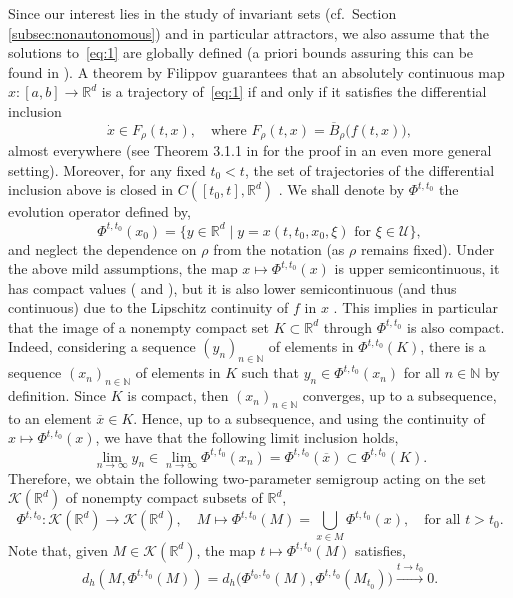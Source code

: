 \documentclass[reqno]{amsart}
\theoremstyle{definition}
\numberwithin{equation}{section}
\newcommand{\N}{\mathbb{N}}
\newcommand{\R}{\mathbb{R}}
\newcommand{\K}{\mathcal{K}}
\newcommand{\U}{\mathcal{U}}
\newcommand{\nin}{{n\in\N}}
\newcommand{\nti}{{n\to\infty}}
\begin{document}
Since our interest lies in the study of invariant sets (cf.~Section \ref{subsec:nonautonomous}) and in particular attractors, we also assume that the solutions to~\eqref{eq:1} are globally defined (a priori bounds assuring this can be found in \cite{hale2009ordinary, bressan2007introduction}). 
A theorem by Filippov guarantees that an absolutely continuous map $x: [a,b]\to \R^d$ is a trajectory of~\eqref{eq:1} if and only if it satisfies the differential inclusion
\begin{equation}
    \label{eq:set-valued-systems}
\dot x\in F_\rho(t,x),\quad\text{where } F_\rho(t,x)=\overline B_\rho\big(f(t,x)\big),
\end{equation}
almost everywhere (see Theorem 3.1.1 in \cite{bressan2007introduction} for the proof in an even more general setting). Moreover, for any fixed $t_0<t$, the set of trajectories of the differential inclusion above is closed in $C([t_0,t],\R^d)$ \cite[Theorem 3.3.1]{bressan2007introduction}. 
We shall denote by $\Phi^{t,t_0}$ the evolution operator defined by,
\[
\Phi^{t,t_0}(x_0)=\{y\in\R^d\mid y=x(t,t_0,x_0,\xi) \text{ for } \xi\in\U\},
\] 
and neglect the dependence on $\rho$ from the notation (as $\rho$ remains fixed).
 Under the above mild assumptions, the map $x\mapsto \Phi^{t,t_0}(x)$ is upper semicontinuous, %
 it has compact values (\cite[Corollary 7.1]{deimling2011multivalued} and \cite{aubin1984differential}), but it is also lower semicontinuous (and thus continuous) due to the Lipschitz continuity of $f$ in $x$ \cite[Corollary 2.4.1]{aubin1984differential}. 
 This implies in particular that the image of a nonempty compact set $K\subset \R^d$ through $\Phi^{t,t_0}$ is also compact. Indeed, considering a sequence $(y_n)_\nin$ of elements in $\Phi^{t,t_0}(K)$, there is a sequence $(x_n)_\nin$ of elements in $K$ such that $y_n\in \Phi^{t,t_0}(x_n)$ for all $\nin$ by definition. Since $K$ is compact, then $(x_n)_\nin$ converges, up to a subsequence, to an element $\overline x\in K$. Hence, up to a subsequence, and using the continuity of $x\mapsto \Phi^{t,t_0}(x)$, we have that the following limit inclusion holds,
 \[
 \lim_\nti y_n\in  \lim_\nti \Phi^{t,t_0}(x_n)=\Phi^{t,t_0}(\overline x)\subset \Phi^{t,t_0}(K).
 \]
 Therefore, we obtain the following two-parameter semigroup acting on the set $\K(\R^d)$ of nonempty compact subsets of $\R^d$,
\[
\Phi^{t,t_0}:\K(\R^d)\to \K(\R^d),\quad M\mapsto\Phi^{t,t_0}(M)=\bigcup_{x\in M}\Phi^{t,t_0}(x),\quad \text{for all } t>t_0. 
\]
Note that, given $M\in \K(\R^d)$, the map  $t\mapsto \Phi^{t,t_0}(M)$ satisfies,
\[
d_h(M,\Phi^{t,t_0}(M))= d_h\big(\Phi^{t_0,t_0}(M ),\Phi^{t,t_0}(M_{t_0} )\big)\xrightarrow{t\to t_0} 0.
\]
\end{document}

